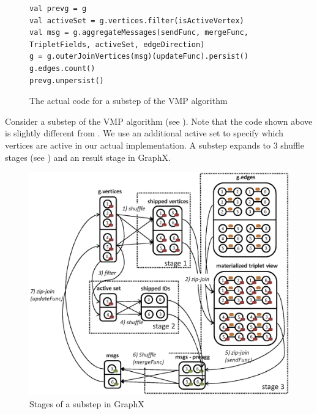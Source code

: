\begin{figure}[h]
\centering
\begin{lstlisting}
val prevg = g
val activeSet = g.vertices.filter(isActiveVertex)
val msg = g.aggregateMessages(sendFunc, mergeFunc, TripletFields, activeSet, edgeDirection)
g = g.outerJoinVertices(msg)(updateFunc).persist()
g.edges.count()
prevg.unpersist()
\end{lstlisting}
\caption{The actual code for a substep of the VMP algorithm}
\label{fig:code_substep_actual}
\end{figure}

Consider a substep of the VMP algorithm (see ).
Note that the code shown above is slightly different from
. We use an additional active set to specify
which vertices are active in our actual implementation. A substep expands to 3
shuffle stages (see ) and an result stage in GraphX.

\begin{figure}[t]
	\centering
	\includegraphics[scale=0.5,clip]{figs/graphx_substep.eps}
	\caption{Stages of a substep in GraphX}
	\label{fig:graphx_substep}
\end{figure}

